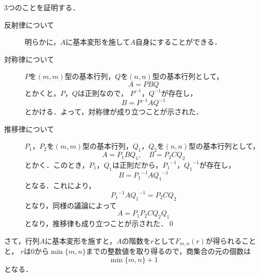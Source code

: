 \documentclass[a4paper,10pt,fleqn]{ltjsarticle}
\begin{document}
\begin{tleftbar}
    3つのことを証明する．
    \begin{description}
        \item [反射律について] 明らかに，$A$に基本変形を施して$A$自身にすることができる．
        \item [対称律について] $P$を$(m,m)$型の基本行列，$Q$を$(n,n)$型の基本行列として，
              \[
                  A = P B Q
              \]
              とかくと，$P$，$Q$は正則なので， $P^{-1}$，$Q^{-1}$が存在し，
              \[
                  B= P^{-1} A Q^{-1}
              \]
              とかける．よって，対称律が成り立つことが示された．
        \item[推移律について] $P_1$，$P_2$を$(m,m)$型の基本行列，$Q_1$，$Q_2$を$(n,n)$型の基本行列として，
              \[
                  A = P_1 B Q_1 , \quad B = P_2 C Q_2
              \]
              とかく．このとき，$P_1$，$Q_1$は正則だから，${P_1}^{-1}$，${Q_1}^{-1}$が存在し，
              \[
                  B = {P_1}^{-1} A {Q_1}^{-1}
              \]
              となる．これにより，
              \[
                  {P_1}^{-1} A {Q_1}^{-1} =P_2 C Q_2
              \]
              となり，同様の議論によって
              \[
                  A = P_1 P_2 C Q_2 Q_1
              \]
              となり，推移律も成り立つことが示された．\qed
    \end{description}
    さて，行列$A$に基本変形を施すと，$A$の階数を$r$として$F_{m,n} (r)$が得られることと，
    $r$は$0$から$\min \{m,n\}$までの整数値を取り得るので，商集合の元の個数は
    \[
        \min \{ m , n \} +1
    \]
    となる．
\end{tleftbar}


\newpage
\end{document}
